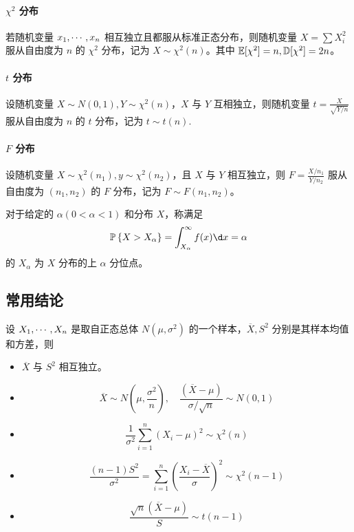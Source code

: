 \paragraph{$\chi^2$ 分布}

若随机变量 $x_1,\cdots,x_n$ 相互独立且都服从标准正态分布，则随机变量 $X = \sum X_i^2$ 服从自由度为 $n$ 的 $\chi^2$ 分布，记为 $X \sim \chi^2(n)$。其中 $\mathbb{E}[\chi^2] = n, \mathbb{D}[\chi^2] = 2n$。


\paragraph{$t$ 分布}

设随机变量 $X \sim N(0, 1), Y \sim \chi^2(n)$，$X$ 与 $Y$ 互相独立，则随机变量 $t = \frac{X}{\sqrt{Y / n}}$ 服从自由度为 $n$ 的 $t$ 分布，记为 $t \sim t(n)$.

\paragraph{$F$ 分布}

设随机变量 $X \sim \chi^2(n_1), y \sim \chi^2(n_2)$，且 $X$ 与 $Y$ 相互独立，则 $F = \frac{X / n_1}{Y / n_2}$ 服从自由度为 $(n_1, n_2)$ 的 $F$ 分布，记为 $F \sim F(n_1, n_2)$。

对于给定的 $\alpha(0 < \alpha < 1)$ 和分布 $X$，称满足
\[ \bbP\left\{X > X_\alpha\right\} = \int_{X_\alpha}^{\infty} f(x) \d x = \alpha  \]
的 $X_\alpha$ 为 $X$ 分布的上 $\alpha$ 分位点。

\subsection{常用结论}

设 $X_1,\cdots,X_n$ 是取自正态总体 $N(\mu, \sigma^2)$ 的一个样本，$\overline{X}, S^2$ 分别是其样本均值和方差，则
\begin{itemize}
	\item $\overline{X}$ 与 $S^2$ 相互独立。
	\item \[ \overline{X} \sim N\left(\mu, \frac{\sigma^2}{n}\right), \quad \frac{(\overline{X}-\mu)}{\sigma / \sqrt{n}} \sim N(0, 1) \]
	\item \[ \frac{1}{\sigma^2} \sum_{i=1}^{n} (X_i - \mu)^2 \sim \chi^2(n) \]
	\item \[ \frac{(n-1)S^2}{\sigma^2} = \sum_{i=1}^n \left(\frac{X_i - \overline{X}}{\sigma}\right)^2 \sim \chi^2(n-1) \]
	\item \[ \frac{\sqrt{n}(\overline{X}-\mu)}{S} \sim t(n-1) \]
\end{itemize}

